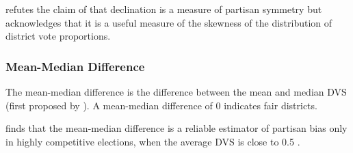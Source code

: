 \textcite{katz2020} refutes the claim of \textcite{warrington2018} that declination is a measure of partisan symmetry but acknowledges that it is a useful measure of the skewness of the distribution of district vote proportions. 

\subsubsection{Mean-Median Difference}
\label{sec:meanmed}

The mean-median difference is the difference between the mean and median DVS (first proposed by \textcite{mcdonald2015}). A mean-median difference of 0 indicates fair districts. 

\textcite{katz2020} finds that the mean-median difference is a reliable estimator of partisan bias only in highly competitive elections, when the average DVS is close to 0.5 \parencite{katz2020}.
